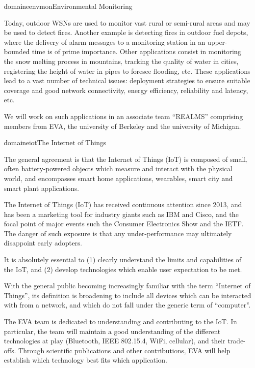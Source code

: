 \documentclass{ra2016}
\begin{document}
\begin{module}{domaine}{envmon}{Environmental Monitoring}

Today, outdoor WSNs are used to monitor vast rural or semi-rural areas and may be used to detect fires.
Another example is detecting fires in outdoor fuel depots, where the delivery of alarm messages to a monitoring station in an upper-bounded time is of prime importance.
Other applications consist in monitoring the snow melting process in mountains, tracking the quality of water in cities, registering the height of water in pipes to foresee flooding, etc.
These applications lead to a vast number of technical issues: deployment strategies to ensure suitable coverage and good network connectivity, energy efficiency, reliability and latency, etc.

We will work on such applications in an associate team ``REALMS'' comprising members from EVA, the university of Berkeley and the university of Michigan. 

\end{module}

\begin{module}{domaine}{iot}{The Internet of Things}

The general agreement is that the Internet of Things (IoT) is composed of small, often battery-powered objects which measure and interact with the physical world, and encompasses smart home applications, wearables, smart city and smart plant applications.

The Internet of Things (IoT) has received continuous attention since 2013, and has been a marketing tool for industry giants such as IBM and Cisco, and the focal point of major events such the Consumer Electronics Show and the IETF.
The danger of such exposure is that any under-performance may ultimately disappoint early adopters.

It is absolutely essential to (1) clearly understand the limits and capabilities of the IoT, and (2) develop technologies which enable user expectation to be met.

With the general public becoming increasingly familiar with the term ``Internet of Things'', its definition is broadening to include all devices which can be interacted with from a network, and which do not fall under the generic term of ``computer''.

The EVA team is dedicated to understanding and contributing to the IoT.
In particular, the team will maintain a good understanding of the different technologies at play (Bluetooth, IEEE 802.15.4, WiFi, cellular), and their trade-offs.
Through scientific publications and other contributions, EVA will help establish which technology best fits which application.

\end{module}
\end{document}
